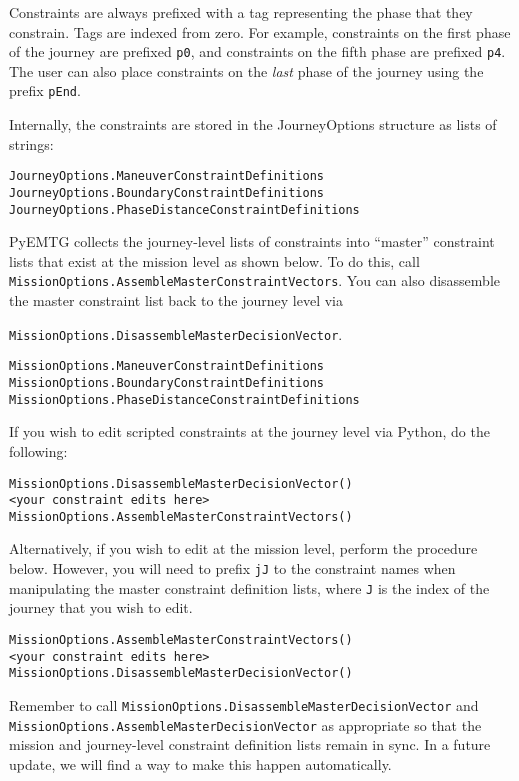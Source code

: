 \documentclass[11pt]{article}
\begin{document}
Constraints are always prefixed with a tag representing the phase that they constrain. Tags are indexed from zero. For example, constraints on the first phase of the journey are prefixed \texttt{p0}, and constraints on the fifth phase are prefixed \texttt{p4}. The user can also place constraints on the \textit{last} phase of the journey using the prefix \texttt{pEnd}.

Internally, the constraints are stored in the JourneyOptions structure as lists of strings:

\begin{verbatim}
JourneyOptions.ManeuverConstraintDefinitions
JourneyOptions.BoundaryConstraintDefinitions
JourneyOptions.PhaseDistanceConstraintDefinitions
\end{verbatim}

PyEMTG collects the journey-level lists of constraints into ``master'' constraint lists that exist at the mission level as shown below. To do this, call \texttt{MissionOptions.AssembleMasterConstraintVectors}. You can also disassemble the master constraint list back to the journey level via 

 \texttt{MissionOptions.DisassembleMasterDecisionVector}.

\begin{verbatim}
MissionOptions.ManeuverConstraintDefinitions
MissionOptions.BoundaryConstraintDefinitions
MissionOptions.PhaseDistanceConstraintDefinitions
\end{verbatim}

If you wish to edit scripted constraints at the journey level via Python, do the following:

\begin{verbatim}
MissionOptions.DisassembleMasterDecisionVector()
<your constraint edits here>
MissionOptions.AssembleMasterConstraintVectors()
\end{verbatim}

Alternatively, if you wish to edit at the mission level, perform the procedure below. However, you will need to prefix \texttt{jJ} to the constraint names when manipulating the master constraint definition lists, where \texttt{J} is the index of the journey that you wish to edit.

\begin{verbatim}
MissionOptions.AssembleMasterConstraintVectors()
<your constraint edits here>
MissionOptions.DisassembleMasterDecisionVector()
\end{verbatim}

Remember to call \texttt{MissionOptions.DisassembleMasterDecisionVector} and \\ \texttt{MissionOptions.AssembleMasterDecisionVector} as appropriate so that the mission and journey-level constraint definition lists remain in sync. In a future update, we will find a way to make this happen automatically.
\end{document}
